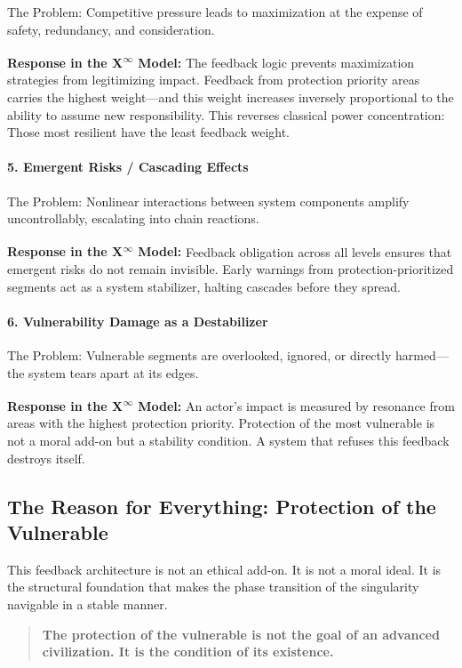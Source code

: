 \documentclass[12pt,a4paper]{article}
\begin{document}
The Problem:  
Competitive pressure leads to maximization at the expense of safety, redundancy, and consideration.

\textbf{Response in the X\textsuperscript{\(\infty\)} Model:}  
The feedback logic prevents maximization strategies from legitimizing impact.  
Feedback from protection priority areas carries the highest weight—and this weight increases inversely proportional to the ability to assume new responsibility.  
This reverses classical power concentration: Those most resilient have the least feedback weight.

\paragraph{5. Emergent Risks / Cascading Effects}

The Problem:  
Nonlinear interactions between system components amplify uncontrollably, escalating into chain reactions.

\textbf{Response in the X\textsuperscript{\(\infty\)} Model:}  
Feedback obligation across all levels ensures that emergent risks do not remain invisible.  
Early warnings from protection-prioritized segments act as a system stabilizer, halting cascades before they spread.

\paragraph{6. Vulnerability Damage as a Destabilizer}

The Problem:  
Vulnerable segments are overlooked, ignored, or directly harmed—the system tears apart at its edges.

\textbf{Response in the X\textsuperscript{\(\infty\)} Model:}  
An actor’s impact is measured by resonance from areas with the highest protection priority.  
Protection of the most vulnerable is not a moral add-on but a stability condition.  
A system that refuses this feedback destroys itself.

\subsection{The Reason for Everything: Protection of the Vulnerable}

This feedback architecture is not an ethical add-on. It is not a moral ideal.  
It is the structural foundation that makes the phase transition of the singularity navigable in a stable manner.

\begin{quote}
\textbf{The protection of the vulnerable is not the goal of an advanced civilization. It is the condition of its existence.}
\end{quote}
\end{document}
